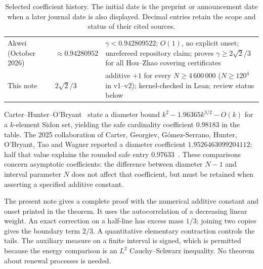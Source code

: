 \documentclass[10pt]{article}
\numberwithin{equation}{section}
\theoremstyle{remark}
\begin{document}
\begin{table}[ht]
\begin{tabular}{@{}p{}p{}p{}@{}}
Akwei (October 2026)~\cite{Akw26a}
& $\approx0.94280952$ & $\gamma<0.942809522$; $O(1)$, no explicit onset; unrefereed repository claim; proves $\gamma\ge2\sqrt2/3$ for all Hou--Zhao covering certificates\\
This note
& $2\sqrt2/3$ & additive $+1$ for every $N\ge4\,600\,000$ ($N\ge120^4$ in v1--v2); kernel-checked in Lean; review status below\\
\bottomrule
\end{tabular}
\caption{Selected coefficient history. The initial date is the preprint or
announcement date when a later journal date is also displayed. Decimal
entries retain the scope and status of their cited sources.}
\label{tab:history}
\end{table}

Carter--Hunter--O'Bryant~\cite{CHO25} state a diameter bound
$k^2-1.96365k^{3/2}-O(k)$ for a $k$-element Sidon set, yielding the safe
cardinality coefficient $0.98183$ in the table. The 2025 collaboration of
Carter, Georgiev, G\'omez-Serrano, Hunter, O'Bryant, Tao and Wagner reported
a diameter coefficient $1.9526463099204112$; half that value explains the
rounded safe entry $0.97633$~\cite{AE25}. These comparisons concern
asymptotic coefficients: the difference between diameter $N-1$ and
interval parameter $N$ does not affect that coefficient, but must be
retained when asserting a specified additive constant.

The present note gives a complete proof with the numerical additive
constant and onset printed in the theorem. It uses the autocorrelation
of a decreasing linear weight. An exact correction on a half-line has
excess mass $1/3$; joining two copies gives the boundary term $2/3$.
A quantitative elementary contraction controls the tails. The auxiliary
measure on a finite interval is signed, which is permitted because the
energy comparison is an $L^2$ Cauchy--Schwarz inequality. No theorem about
renewal processes is needed.
\end{document}
